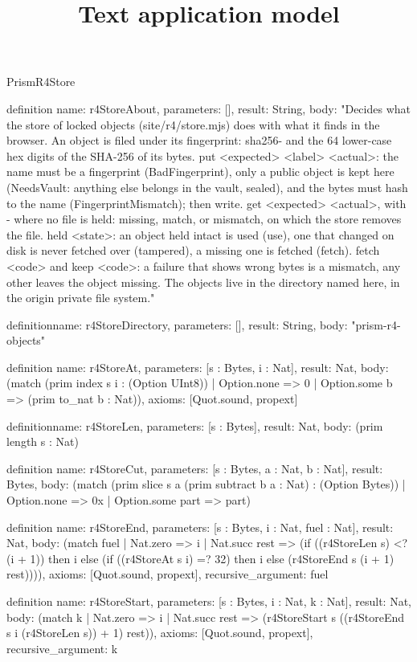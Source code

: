 \begin{lexlean}{PrismR4Store}
\title{Text application model}
\begin{semanticmodule}
definition{
  name: r4StoreAbout,
  parameters: [],
  result: String,
  body: "Decides what the store of locked objects (site/r4/store.mjs) does with what it finds in the browser. An object is filed under its fingerprint: sha256- and the 64 lower-case hex digits of the SHA-256 of its bytes. put <expected> <label> <actual>: the name must be a fingerprint (BadFingerprint), only a public object is kept here (NeedsVault: anything else belongs in the vault, sealed), and the bytes must hash to the name (FingerprintMismatch); then write. get <expected> <actual>, with - where no file is held: missing, match, or mismatch, on which the store removes the file. held <state>: an object held intact is used (use), one that changed on disk is never fetched over (tampered), a missing one is fetched (fetch). fetch <code> and keep <code>: a failure that shows wrong bytes is a mismatch, any other leaves the object missing. The objects live in the directory named here, in the origin private file system."
}

definition{name: r4StoreDirectory, parameters: [], result: String, body: "prism-r4-objects"}

definition{
  name: r4StoreAt,
  parameters: [s : Bytes, i : Nat],
  result: Nat,
  body: (match (prim index s i : (Option UInt8))
    | Option.none => 0
    | Option.some b => (prim to_nat b : Nat)),
  axioms: [Quot.sound, propext]
}

definition{name: r4StoreLen, parameters: [s : Bytes], result: Nat, body: (prim length s : Nat)}

definition{
  name: r4StoreCut,
  parameters: [s : Bytes, a : Nat, b : Nat],
  result: Bytes,
  body: (match (prim slice s a (prim subtract b a : Nat) : (Option Bytes))
    | Option.none => 0x
    | Option.some part => part)
}

definition{
  name: r4StoreEnd,
  parameters: [s : Bytes, i : Nat, fuel : Nat],
  result: Nat,
  body: (match fuel
    | Nat.zero => i
    | Nat.succ rest => (if ((r4StoreLen s) <? (i + 1)) then i else (if ((r4StoreAt s i) =? 32) then i else (r4StoreEnd s (i + 1) rest)))),
  axioms: [Quot.sound, propext],
  recursive_argument: fuel
}

definition{
  name: r4StoreStart,
  parameters: [s : Bytes, i : Nat, k : Nat],
  result: Nat,
  body: (match k
    | Nat.zero => i
    | Nat.succ rest => (r4StoreStart s ((r4StoreEnd s i (r4StoreLen s)) + 1) rest)),
  axioms: [Quot.sound, propext],
  recursive_argument: k
}


\end{semanticmodule}
\end{lexlean}
